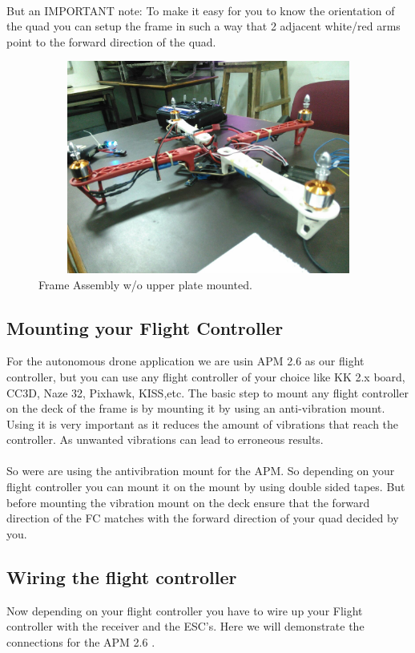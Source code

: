 \documentclass[11pt,a4paper]{article}
\begin{document}
		\paragraph{}But an IMPORTANT note: To make it easy for you to know the orientation of the quad you can setup the frame in such a way that 2 adjacent white/red arms point to the forward direction of the quad.
		\begin{figure}[h]
	 	
	 	\centering
		\includegraphics[width=12cm,height=7cm]{frame}
		\caption{Frame Assembly w/o upper plate mounted.}
		\end{figure}
		
		\subsection{Mounting your Flight Controller}
		For the autonomous drone application we are usin APM 2.6 as our flight controller, but you can use any flight controller of your choice like KK 2.x board, CC3D, Naze 32, Pixhawk, KISS,etc. The basic step to mount any flight controller on the deck of the frame is by mounting it by using an anti-vibration mount. Using it is very important as it reduces the amount of vibrations that reach the controller. As unwanted vibrations can lead to erroneous results.
		\paragraph{}So were are using the antivibration mount for the APM. So depending on your flight controller you can mount it on the mount by using double sided tapes. But before mounting the vibration mount on the deck ensure that the forward direction of the FC matches with the forward direction of your quad decided by you.
		
		\subsection{Wiring the flight controller}
		Now depending on your flight controller you have to wire up your Flight controller with the receiver and the ESC's. Here we will demonstrate the connections for the APM 2.6 .
\end{document}
